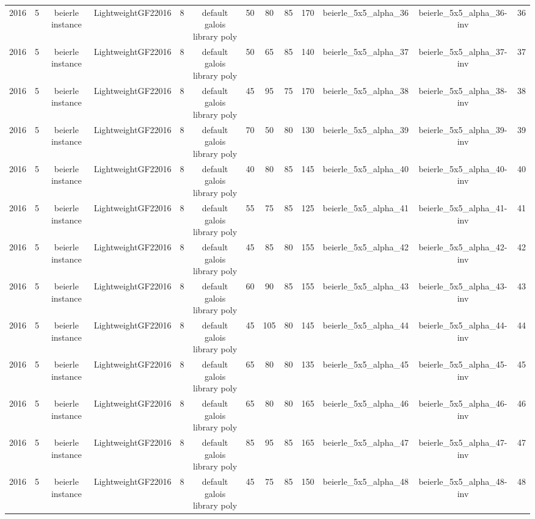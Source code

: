 \begin{tabular}{c c c c c c c c c c c c c}
2016 & 5 & beierle instance & LightweightGF22016 & 8 & default galois library poly & 50 & 80 & 85 & 170 & beierle_5x5_alpha_36 & beierle_5x5_alpha_36-inv & 36 \\
2016 & 5 & beierle instance & LightweightGF22016 & 8 & default galois library poly & 50 & 65 & 85 & 140 & beierle_5x5_alpha_37 & beierle_5x5_alpha_37-inv & 37 \\
2016 & 5 & beierle instance & LightweightGF22016 & 8 & default galois library poly & 45 & 95 & 75 & 170 & beierle_5x5_alpha_38 & beierle_5x5_alpha_38-inv & 38 \\
2016 & 5 & beierle instance & LightweightGF22016 & 8 & default galois library poly & 70 & 50 & 80 & 130 & beierle_5x5_alpha_39 & beierle_5x5_alpha_39-inv & 39 \\
2016 & 5 & beierle instance & LightweightGF22016 & 8 & default galois library poly & 40 & 80 & 85 & 145 & beierle_5x5_alpha_40 & beierle_5x5_alpha_40-inv & 40 \\
2016 & 5 & beierle instance & LightweightGF22016 & 8 & default galois library poly & 55 & 75 & 85 & 125 & beierle_5x5_alpha_41 & beierle_5x5_alpha_41-inv & 41 \\
2016 & 5 & beierle instance & LightweightGF22016 & 8 & default galois library poly & 45 & 85 & 80 & 155 & beierle_5x5_alpha_42 & beierle_5x5_alpha_42-inv & 42 \\
2016 & 5 & beierle instance & LightweightGF22016 & 8 & default galois library poly & 60 & 90 & 85 & 155 & beierle_5x5_alpha_43 & beierle_5x5_alpha_43-inv & 43 \\
2016 & 5 & beierle instance & LightweightGF22016 & 8 & default galois library poly & 45 & 105 & 80 & 145 & beierle_5x5_alpha_44 & beierle_5x5_alpha_44-inv & 44 \\
2016 & 5 & beierle instance & LightweightGF22016 & 8 & default galois library poly & 65 & 80 & 80 & 135 & beierle_5x5_alpha_45 & beierle_5x5_alpha_45-inv & 45 \\
2016 & 5 & beierle instance & LightweightGF22016 & 8 & default galois library poly & 65 & 80 & 80 & 165 & beierle_5x5_alpha_46 & beierle_5x5_alpha_46-inv & 46 \\
2016 & 5 & beierle instance & LightweightGF22016 & 8 & default galois library poly & 85 & 95 & 85 & 165 & beierle_5x5_alpha_47 & beierle_5x5_alpha_47-inv & 47 \\
2016 & 5 & beierle instance & LightweightGF22016 & 8 & default galois library poly & 45 & 75 & 85 & 150 & beierle_5x5_alpha_48 & beierle_5x5_alpha_48-inv & 48 \\

\end{tabular}
